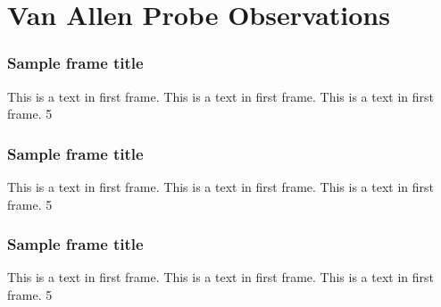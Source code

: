 \documentclass{beamer}
\begin{document}

\section{Van Allen Probe Observations}


\begin{frame}
\frametitle{Sample frame title}
This is a text in first frame. This is a text in first frame. This is a text in first frame.
\SI{5}{\nT}
\end{frame}


\begin{frame}
\frametitle{Sample frame title}
This is a text in first frame. This is a text in first frame. This is a text in first frame.
\SI{5}{\nT}
\end{frame}




\begin{frame}
\frametitle{Sample frame title}
This is a text in first frame. This is a text in first frame. This is a text in first frame.
\SI{5}{\nT}
\end{frame}






 
\end{document}
